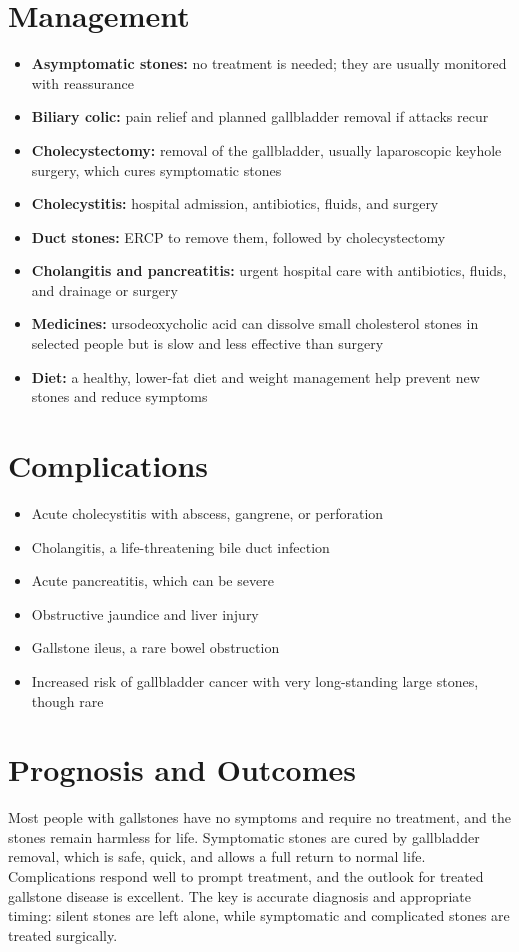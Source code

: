 \section*{Management}
\begin{itemize}
    \item \textbf{Asymptomatic stones:} no treatment is needed; they are usually monitored with reassurance
    \item \textbf{Biliary colic:} pain relief and planned gallbladder removal if attacks recur
    \item \textbf{Cholecystectomy:} removal of the gallbladder, usually laparoscopic keyhole surgery, which cures symptomatic stones
    \item \textbf{Cholecystitis:} hospital admission, antibiotics, fluids, and surgery
    \item \textbf{Duct stones:} ERCP to remove them, followed by cholecystectomy
    \item \textbf{Cholangitis and pancreatitis:} urgent hospital care with antibiotics, fluids, and drainage or surgery
    \item \textbf{Medicines:} ursodeoxycholic acid can dissolve small cholesterol stones in selected people but is slow and less effective than surgery
    \item \textbf{Diet:} a healthy, lower-fat diet and weight management help prevent new stones and reduce symptoms
\end{itemize}

\section*{Complications}
\begin{itemize}
    \item Acute cholecystitis with abscess, gangrene, or perforation
    \item Cholangitis, a life-threatening bile duct infection
    \item Acute pancreatitis, which can be severe
    \item Obstructive jaundice and liver injury
    \item Gallstone ileus, a rare bowel obstruction
    \item Increased risk of gallbladder cancer with very long-standing large stones, though rare
\end{itemize}

\section*{Prognosis and Outcomes}
Most people with gallstones have no symptoms and require no treatment, and the stones remain harmless for life. Symptomatic stones are cured by gallbladder removal, which is safe, quick, and allows a full return to normal life. Complications respond well to prompt treatment, and the outlook for treated gallstone disease is excellent. The key is accurate diagnosis and appropriate timing: silent stones are left alone, while symptomatic and complicated stones are treated surgically.


